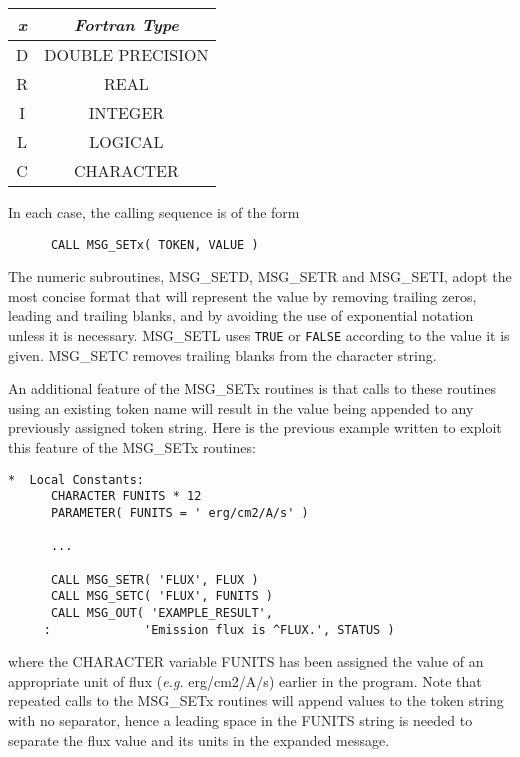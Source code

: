 \begin {center}
\begin {tabular}{||c|c||}
\hline
{\em x} & {\em Fortran Type}\\
\hline
D & DOUBLE PRECISION\\
R & REAL\\
I & INTEGER\\
L & LOGICAL\\
C & CHARACTER\\
\hline
\end {tabular}
\end {center}

In each case, the calling sequence is of the form

\begin {small}
\begin{verbatim}
      CALL MSG_SETx( TOKEN, VALUE )
\end{verbatim}
\end {small}

The numeric subroutines, MSG\_SETD, MSG\_SETR and MSG\_SETI, adopt the most
concise format that will represent the value by removing trailing zeros,
leading and trailing blanks, and by avoiding the use of exponential notation
unless it is necessary. 
MSG\_SETL uses {\tt TRUE} or {\tt FALSE} according to the value it is given. 
MSG\_SETC removes trailing blanks from the character string. 

An additional feature of the MSG\_SETx routines is that calls to these routines
using an existing token name will result in the value being appended to any
previously assigned token string.
Here is the previous example written to exploit this feature of the MSG\_SETx
routines:

\begin {small}
\begin{verbatim}
*  Local Constants:
      CHARACTER FUNITS * 12
      PARAMETER( FUNITS = ' erg/cm2/A/s' )

      ...

      CALL MSG_SETR( 'FLUX', FLUX )
      CALL MSG_SETC( 'FLUX', FUNITS )
      CALL MSG_OUT( 'EXAMPLE_RESULT', 
     :             'Emission flux is ^FLUX.', STATUS )
\end{verbatim}
\end {small}

where the CHARACTER variable FUNITS has been assigned the value of an 
appropriate unit of flux ({\em e.g.} erg/cm2/A/s) earlier in the program.
Note that repeated calls to the MSG\_SETx routines will append values to the 
token string with no separator, hence a leading space in the FUNITS string 
is needed to separate the flux value and its units in the expanded message.

